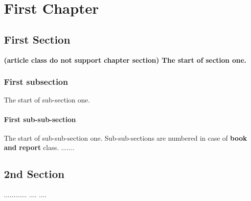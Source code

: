 \documentclass{report}
\begin{document}
    \chapter{First Chapter}
	\section{First Section}
	\bfseries\huge (article class do not support  chapter section) \normalfont\normalsize The start of section one.
	\subsection{First subsection}
	The start of sub-section one.
	\subsubsection{First sub-sub-section}
	The start of sub-sub-section one. Sub-sub-sections are numbered in case of {\bf\Huge book and report} class.
	\newpage
	.......
    \newpage
    \section{2nd Section}
    ............
    \newpage
    ....
    \newpage
    ....
\end{document}
